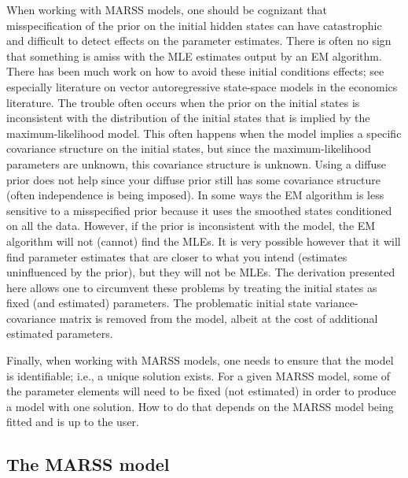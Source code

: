 \documentclass[]{article}
\begin{document}
When working with MARSS models, one should be cognizant that misspecification of the prior on the initial hidden states can have catastrophic and difficult to detect effects on the parameter estimates.  There is often no sign that something is amiss with the MLE estimates output by an EM algorithm.  There has been much work on how to avoid these initial conditions effects; see especially literature on vector autoregressive state-space models in the economics literature.  The trouble often occurs when the prior on the initial states is inconsistent with the distribution of the initial states that is implied by the maximum-likelihood model.  This often happens when the model implies a specific covariance structure on the initial states, but since the maximum-likelihood parameters are unknown, this covariance structure is unknown.  Using a diffuse prior does not help since your diffuse prior still has some covariance structure (often independence is being imposed).  In some ways the EM algorithm is less sensitive to a misspecified prior because it uses the smoothed states conditioned on all the data.  However, if the prior is inconsistent with the model, the EM algorithm will not (cannot) find the MLEs.  It is very possible however that it will find parameter estimates that are closer to what you intend (estimates uninfluenced by the prior), but they will not be MLEs.  The derivation presented here allows one to circumvent these problems by treating the initial states as fixed (and estimated) parameters.  The problematic initial state variance-covariance matrix is removed from the model, albeit at the cost of additional estimated parameters.

Finally, when working with MARSS models, one needs to ensure that the model is identifiable; i.e.,  a unique solution exists.  For a given MARSS model,  some of the parameter elements will need to be fixed (not estimated) in order to produce a model with one solution.  How to do that depends on the MARSS model being fitted and is up to the user.

\subsection{The MARSS model}
\end{document}
